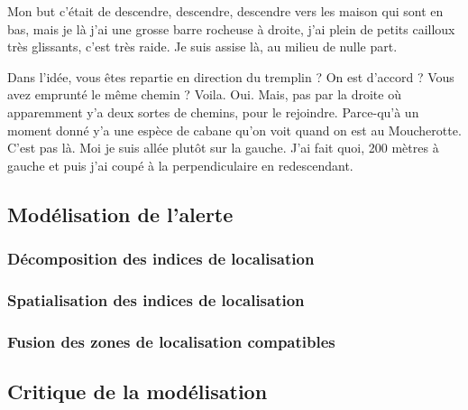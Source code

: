 \begin{dialogue}
  \Req {} Mon but c’était de descendre, descendre, descendre
  vers les maison qui sont en bas,  mais je là j’ai une
  grosse barre rocheuse à droite,  j’ai plein de petits
  cailloux très glissants,  c’est très raide.  Je
  suis assise là, au milieu de nulle part.
\end{dialogue}


\begin{dialogue}
  \Sec {} Dans l’idée, vous êtes repartie en direction du
  tremplin ? On est d’accord ? Vous avez emprunté le même chemin ?
  \Req {} Voila. Oui.  Mais, pas par la droite où
   apparemment y’a deux sortes de chemins, pour le
  rejoindre.  Parce-qu’à un moment donné y’a une espèce de
  cabane qu’on voit quand on est au Moucherotte. C’est pas
  là.  Moi je suis allée plutôt sur la gauche. J’ai fait
  quoi, 200 mètres à gauche et  puis j’ai coupé à la
  perpendiculaire en redescendant.
\end{dialogue}

\subsection{Modélisation de l'alerte}
\label{subsec:9-3-2}

\subsubsection{Décomposition des indices de localisation}
\label{subsec:9-3-2-2}

\subsubsection{Spatialisation des indices de localisation}
\label{subsec:9-3-2-3}

\subsubsection{Fusion des zones de localisation compatibles}
\label{subsec:9-3-2-4}

\subsection{Critique de la modélisation}
\label{subsec:9-3-3}


